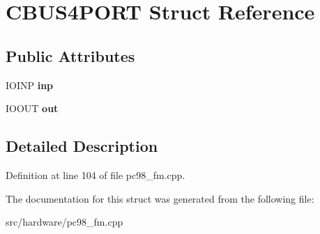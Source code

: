 \hypertarget{structCBUS4PORT}{\section{C\-B\-U\-S4\-P\-O\-R\-T Struct Reference}
\label{structCBUS4PORT}
}
\subsection*{Public Attributes}
\begin{DoxyCompactItemize}
\item 
\hypertarget{structCBUS4PORT_acdfa7680ca648b64bae4afc5b7ccf8a6}{I\-O\-I\-N\-P {\bfseries inp}}\label{structCBUS4PORT_acdfa7680ca648b64bae4afc5b7ccf8a6}

\item 
\hypertarget{structCBUS4PORT_ad38129fe2ce76c6bd2e1f1e6cd7948b3}{I\-O\-O\-U\-T {\bfseries out}}\label{structCBUS4PORT_ad38129fe2ce76c6bd2e1f1e6cd7948b3}

\end{DoxyCompactItemize}


\subsection{Detailed Description}


Definition at line 104 of file pc98\-\_\-fm.\-cpp.



The documentation for this struct was generated from the following file\-:\begin{DoxyCompactItemize}
\item 
src/hardware/pc98\-\_\-fm.\-cpp\end{DoxyCompactItemize}
